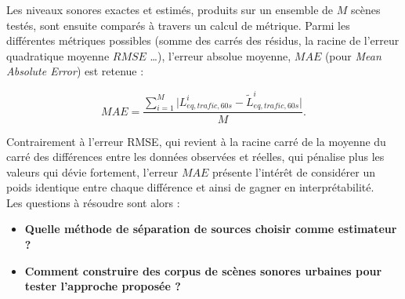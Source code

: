 Les niveaux sonores exactes et estimés, produits sur un ensemble de $M$ scènes testés, sont ensuite comparés à travers un calcul de métrique. Parmi les différentes métriques possibles (somme des carrés des résidus, la racine de l'erreur quadratique moyenne $RMSE$ \dots), l'erreur absolue moyenne, $MAE$ (pour \textit{Mean Absolute Error}) est retenue : 

\begin{equation}
MAE = \frac{\sum_{i = 1}^{M} \vert L_{eq, trafic, 60s}^i - \tilde{L}_{eq, trafic, 60s}^i \vert}{M}.
\end{equation}

Contrairement à l'erreur RMSE, qui revient à la racine carré de la moyenne du carré des différences entre les données observées et réelles, qui pénalise plus les valeurs qui dévie fortement, l'erreur $MAE$ présente l'intérêt de considérer un poids identique entre chaque différence et ainsi de gagner en interprétabilité.\\

Les questions à résoudre sont alors : 
\begin{itemize}
\item \textbf{Quelle méthode de séparation de sources choisir comme estimateur ?}
\item \textbf{Comment construire des corpus de scènes sonores urbaines pour tester l'approche proposée ?}
\end{itemize}

